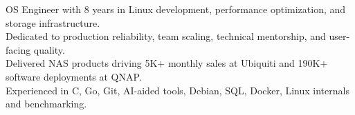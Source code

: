

\begin{cvparagraph}

OS Engineer with 8 years in Linux development, performance optimization, and storage infrastructure.\\
Dedicated to production reliability, team scaling, technical mentorship, and user-facing quality.\\
Delivered NAS products driving 5K+ monthly sales at Ubiquiti and 190K+ software deployments at QNAP.\\
Experienced in C, Go, Git, AI-aided tools, Debian, SQL, Docker, Linux internals and benchmarking.
\end{cvparagraph}
